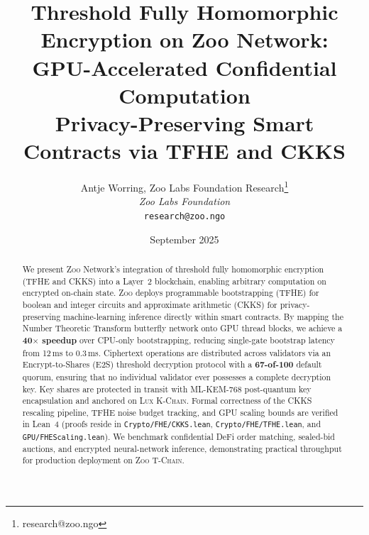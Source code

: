 \documentclass[11pt,letterpaper]{article}
\title{\textbf{Threshold Fully Homomorphic Encryption on Zoo Network:\\GPU-Accelerated Confidential Computation}\\
\large Privacy-Preserving Smart Contracts via TFHE and CKKS}
\author{
Antje Worring, Zoo Labs Foundation Research\thanks{research@zoo.ngo}\\
\textit{Zoo Labs Foundation}\\
\texttt{research@zoo.ngo}
}
\date{September 2025}
\theoremstyle{definition}
\theoremstyle{remark}
\newcommand{\Zoo}{\textsc{Zoo}}
\newcommand{\Lux}{\textsc{Lux}}
\newcommand{\TChain}{\textsc{T-Chain}}
\newcommand{\KChain}{\textsc{K-Chain}}
\newcommand{\TFHE}{\textsc{TFHE}}
\newcommand{\CKKS}{\textsc{CKKS}}
\newcommand{\MLKEM}{\textsc{ML-KEM}}
\begin{document}
\zoocoverpage

\begin{abstract}
We present \Zoo{} Network's integration of threshold fully homomorphic encryption (\TFHE{} and \CKKS{}) into a Layer~2 blockchain, enabling arbitrary computation on encrypted on-chain state. \Zoo{} deploys programmable bootstrapping (\TFHE{}) for boolean and integer circuits and approximate arithmetic (\CKKS{}) for privacy-preserving machine-learning inference directly within smart contracts. By mapping the Number Theoretic Transform butterfly network onto GPU thread blocks, we achieve a \textbf{40$\times$ speedup} over CPU-only bootstrapping, reducing single-gate bootstrap latency from 12\,ms to 0.3\,ms. Ciphertext operations are distributed across validators via an Encrypt-to-Shares (E2S) threshold decryption protocol with a \textbf{67-of-100} default quorum, ensuring that no individual validator ever possesses a complete decryption key. Key shares are protected in transit with \MLKEM{}-768 post-quantum key encapsulation and anchored on \Lux{} \KChain{}. Formal correctness of the \CKKS{} rescaling pipeline, \TFHE{} noise budget tracking, and GPU scaling bounds are verified in Lean~4 (proofs reside in \texttt{Crypto/FHE/CKKS.lean}, \texttt{Crypto/FHE/TFHE.lean}, and \texttt{GPU/FHEScaling.lean}). We benchmark confidential DeFi order matching, sealed-bid auctions, and encrypted neural-network inference, demonstrating practical throughput for production deployment on \Zoo{} \TChain{}.
\end{abstract}

\tableofcontents
\newpage














\end{document}
